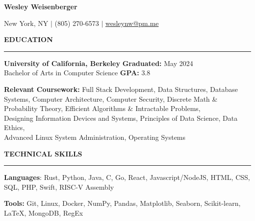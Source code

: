\documentclass{article}
\begin{document}
\pagestyle{fancy}
\fancyhead{}\fancyfoot{}

\newcommand{\header}[1]{
    \vspace{4mm}
    {\large \noindent \textbf{#1}}
    \vspace{1.5mm}
    \hrule
    \vspace{2mm}
}

\begin{center}

    {\LARGE \textbf{Wesley Weisenberger}}

    \vspace{2mm}

    {\large New York, NY  $\mid$ (805) 270-6573
        $\mid$
        \href{mailto:wesleynw@pm.me}{wesleynw@pm.me}
    }

\end{center}

\vspace{-2.5mm}

\header{EDUCATION}

\begin{adjustwidth}{1em}{1em}

    \textbf{University of California, Berkeley}
    \hfill
    \textbf{Graduated:} May 2024 \\
    Bachelor of Arts in Computer Science \hfill  \textbf{GPA:} 3.8

    \vspace{2.5mm}

    \textbf{Relevant Coursework:}
        Full Stack Development,
        Data Structures,
        Database Systems,
        Computer Architecture,
        Computer Security,
        Discrete Math \& Probability Theory,
        Efficient Algorithms \& Intractable Problems, \\
        Designing Information Devices and Systems,
        Principles of Data Science,
        Data Ethics, \\
        Advanced Linux System Administration,
        Operating Systems

\end{adjustwidth}

\header{TECHNICAL SKILLS}

\begin{adjustwidth}{1em}{1em}

    \textbf{Languages}: Rust, Python, Java, C, Go, React, Javascript/NodeJS, HTML, CSS, SQL, PHP, Swift, RISC-V Assembly

    \vspace{1mm}

    \textbf{Tools:} Git, Linux, Docker, NumPy, Pandas, Matplotlib, Seaborn, Scikit-learn, \LaTeX, MongoDB, RegEx

\end{adjustwidth}
\end{document}
